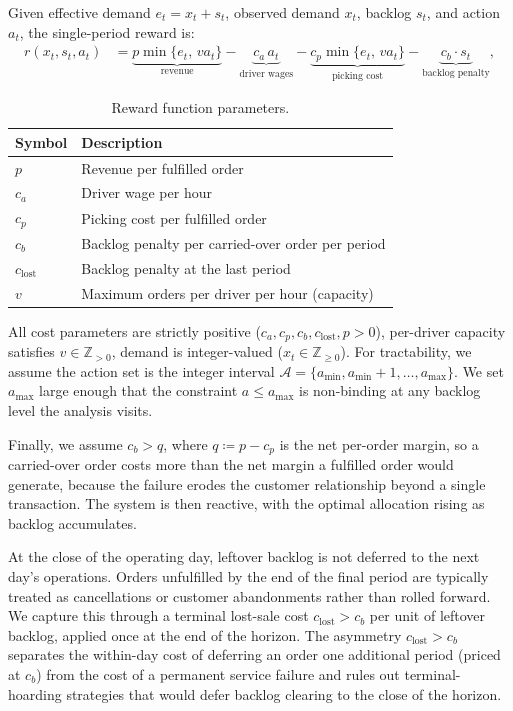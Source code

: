 \documentclass[preprint,11pt,authoryear]{elsarticle}
\theoremstyle{remark}
\begin{document}
Given effective demand $e_t = x_t + s_t$, observed demand $x_t$, backlog $s_t$, and action $a_t$, the single-period reward is:
\begin{align}
    r(x_t, s_t, a_t) &= \underbrace{p \min\{e_t,\, va_t\}}_{\text{revenue}}
                       - \underbrace{c_a \, a_t}_{\text{driver wages}}
                       - \underbrace{c_p \min\{e_t,\, va_t\}}_{\text{picking cost}}
           - \underbrace{c_b \cdot s_t}_{\text{backlog penalty}},
    \label{eq:reward_spillover}
\end{align}

\begin{table}[h]
\centering\small
\caption{Reward function parameters.}
\label{tab:reward_params}
\begin{tabular}{@{}ll@{}}
\toprule
\textbf{Symbol} & \textbf{Description} \\
\midrule
$p$ & Revenue per fulfilled order \\
$c_a$ & Driver wage per hour \\
$c_p$ & Picking cost per fulfilled order \\
$c_b$ & Backlog penalty per carried-over order per period \\
$c_{\text{lost}}$ & Backlog penalty at the last period \\
$v$ & Maximum orders per driver per hour (capacity) \\
\bottomrule
\end{tabular}
\end{table}

All cost parameters are strictly positive ($c_a, c_p, c_b, c_{\text{lost}}, p > 0$), per-driver capacity satisfies $v \in \mathbb{Z}_{>0}$, demand is integer-valued ($x_t \in \mathbb{Z}_{\ge 0}$). For tractability, we assume the action set is the integer interval $\mathcal{A} = \{a_{\min}, a_{\min}+1, \ldots, a_{\max}\}$. We set $a_{\max}$ large enough that the constraint $a \le a_{\max}$ is non-binding at any backlog level the analysis visits.

Finally, we assume $c_b > q$, where $q \coloneqq p -c_p$ is the net per-order margin, so a carried-over order costs more than the net margin a fulfilled order would generate, because the failure erodes the customer relationship beyond a single transaction. The system is then reactive, with the optimal allocation rising as backlog accumulates.

At the close of the operating day, leftover backlog is not deferred to the next day's operations. Orders unfulfilled by the end of the final period are typically treated as cancellations or customer abandonments rather than rolled forward. We capture this through a terminal lost-sale cost $c_{\mathrm{lost}} > c_b$ per unit of leftover backlog, applied once at the end of the horizon. The asymmetry $c_{\mathrm{lost}} > c_b$ separates the within-day cost of deferring an order one additional period (priced at $c_b$) from the cost of a permanent service failure and rules out terminal-hoarding strategies that would defer backlog clearing to the close of the horizon.
\end{document}
